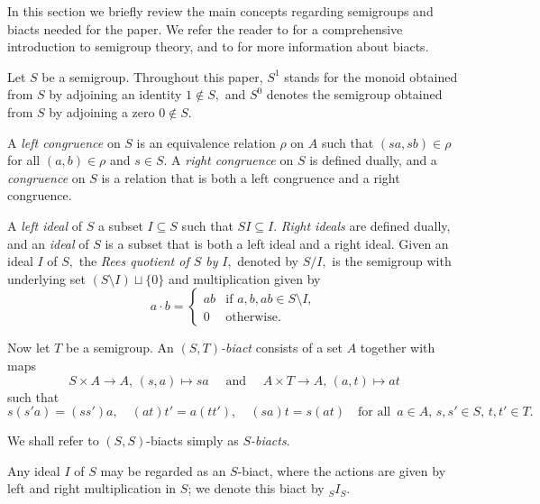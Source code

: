 \documentclass[twoside,a4paper,12pt,reqno]{amsart}
\theoremstyle{plain}
\theoremstyle{definition}
\renewcommand{\S}{{_S}\hspace{-0.1em}}
\newcommand{\sm}{\setminus}
\newcommand{\mt}{\mapsto}
\begin{document}
In this section we briefly review the main concepts regarding semigroups and biacts needed for the paper.  We refer the reader to \cite{Clifford:1961} for a comprehensive introduction to semigroup theory, and to \cite[Section 1.4]{kkm} for more information about biacts.

Let $S$ be a semigroup.  Throughout this paper, $S^1$ stands for the monoid obtained from $S$ by adjoining an identity $1\notin S,$ and $S^0$ denotes the semigroup obtained from $S$ by adjoining a zero $0\notin S.$

A {\em left congruence} on $S$ is an equivalence relation $\rho$ on $A$ such that $(sa,sb)\in\rho$ for all $(a,b)\in\rho$ and $s\in S.$  A {\em right congruence} on $S$ is defined dually, and a {\em congruence} on $S$ is a relation that is both a left congruence and a right congruence.

A {\em left ideal} of $S$ a subset $I\subseteq S$ such that $SI\subseteq I.$  {\em Right ideals} are defined dually, and an {\em ideal} of $S$ is a subset that is both a left ideal and a right ideal.  Given an ideal $I$ of $S,$ the {\em Rees quotient of $S$ by} $I,$ denoted by $S/I,$ is the semigroup with underlying set $(S{\sm}I)\sqcup\{0\}$ and multiplication given by
$$a\cdot b=\begin{cases}
ab&\text{if }a,b,ab\in S{\sm}I,\\
0&\text{otherwise.}
\end{cases}$$

Now let $T$ be a semigroup.  An $(S,T)${\em-biact} consists of a set $A$ together with maps 
$$S\times A\to A,\,(s,a)\mt sa\quad\text{ and }\quad A\times T\to A,\,(a,t)\mt at$$ 
such that
$$s(s'a)=(ss')a,\quad(at)t'=a(tt'),\quad(sa)t=s(at)\quad\text{for all }\,a\in A,\,s,s'\in S,\,t,t'\in T.$$

We shall refer to $(S,S)$-biacts simply as $S${\em-biacts}.  

Any ideal $I$ of $S$ may be regarded as an $S$-biact, where the actions are given by left and right multiplication in $S$; we denote this biact by ${_S}I_S$.  
\end{document}
